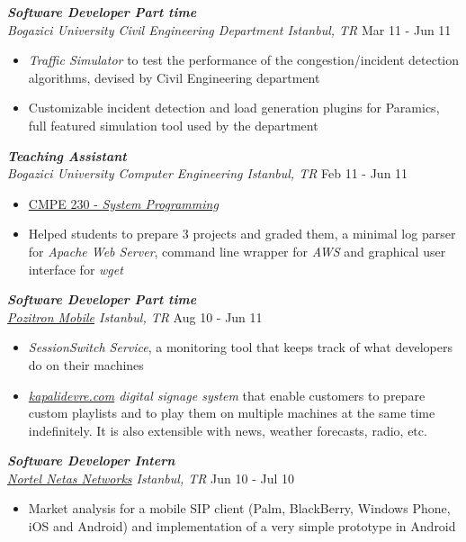 \documentclass[line, margin]{res}
\begin{document}
\begin{resume}
	{\sl \textbf{Software Developer Part time} \\ Bogazici University Civil Engineering Department Istanbul, TR} \hfill Mar 11 - Jun 11 \\
	\vspace{-0.3cm}
	\begin{itemize} \itemsep -2pt
		\item \textit{Traffic Simulator} to test the performance of the congestion/incident detection algorithms, devised by Civil Engineering department
		\item Customizable incident detection and load generation plugins for Paramics, full featured simulation tool used by the department
	\end{itemize}

	{\sl \textbf{Teaching Assistant} \\ Bogazici University Computer Engineering Istanbul, TR} \hfill Feb 11 - Jun 11 \\
	\vspace{-.3cm} 
	\begin{itemize} \itemsep -2pt
		\item \href{http://www.cmpe.boun.edu.tr/courses/?cmpe=230}{CMPE 230 - \textit{System Programming}}
		\item Helped students to prepare 3 projects and graded them, a minimal log parser for \textit{Apache Web Server}, command line wrapper for \textit{AWS} and graphical user interface for \textit{wget}
	\end{itemize}

	{\sl \textbf{Software Developer Part time} \\ \href{http://www.pozitron.com/}{Pozitron Mobile} Istanbul, TR} \hfill Aug 10 - Jun 11 \\
	\vspace{-0.3cm}
	\begin{itemize} \itemsep -2pt
		\item \textit{SessionSwitch Service}, a monitoring tool that keeps track of what developers do on their machines
		\item \textit{\href{http://kapalidevre.com}{kapalidevre.com} digital signage system} that enable customers to prepare custom playlists and to play them on multiple machines at the same time indefinitely. It is also extensible  with news, weather forecasts, radio, etc.
	\end{itemize}

	{\sl \textbf{Software Developer Intern} \\ \href{http://en.netas.com.tr/default.aspx}{Nortel Netas Networks} Istanbul, TR} \hfill Jun 10 - Jul 10 \\
	\vspace{-0.3cm}
	\begin{itemize} \itemsep -2pt
		\item Market analysis for a mobile SIP client (Palm, BlackBerry, Windows Phone, iOS and Android) and implementation of a very simple prototype in Android
	\end{itemize}


\end{resume}
\end{document}
